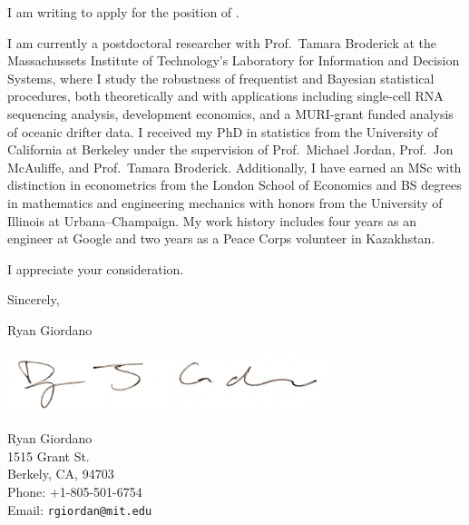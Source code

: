 \vspace{1em}
I am writing to apply for the position of \position.

\vspace{1em} I am currently a postdoctoral researcher with Prof.\ Tamara
Broderick at the Massachussets Institute of Technology's Laboratory for
Information and Decision Systems, where I study the robustness of frequentist
and Bayesian statistical procedures, both theoretically and with applications
including single-cell RNA sequencing analysis, development economics, and a
MURI-grant funded analysis of oceanic drifter data.  I received my PhD in
statistics from the University of California at Berkeley under the supervision
of Prof.\ Michael Jordan, Prof.\ Jon McAuliffe, and Prof.\ Tamara Broderick.
Additionally, I have earned an MSc with distinction in econometrics from the
London School of Economics and BS degrees in mathematics and engineering
mechanics with honors from the University of Illinois at Urbana--Champaign.
My work history includes four years as an engineer at Google and two
years as a Peace Corps volunteer in Kazakhstan.

\vspace{1em}
\deptspecific

\vspace{1em} I appreciate your consideration.

\vspace{1em} Sincerely,

\begin{minipage}[t]{0.7\textwidth}
\vspace{1em} Ryan Giordano

\hspace{-1em}\includegraphics[height=0.7in]{static_images/sig.jpg}
\end{minipage}
\begin{minipage}[t]{0.3\textwidth}
    \vspace{1em}
    Ryan Giordano\\
    1515 Grant St.\\
    Berkely, CA, 94703\\
    Phone: +1-805-501-6754\\
    Email: \texttt{rgiordan@mit.edu}\\
\end{minipage}


